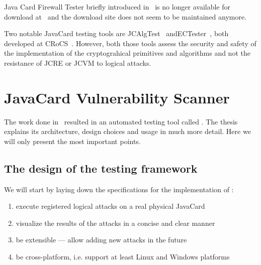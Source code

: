 \documentclass{../llncs/llncs}
\begin{document}

Java Card Firewall Tester briefly introduced in~\cite{Mostowski07testingthe} is no longer available for download at~\cite{firewalltester} and the download site does not seem to be maintained anymore.

Two notable JavaCard testing tools are JCAlgTest~\cite{jcalgtest} and\linebreak ECTester~\cite{ectester}, both developed at CRoCS~\cite{crocsweb}. However, both those tools assess the security and safety of the implementation of the cryptograhical primitives and algorithms and not the resistance of JCRE or JCVM to logical attacks.

\section{JavaCard Vulnerability Scanner}
    The work done in~\cite{anon2020thesis} resulted in an automated testing tool called \projectname. The thesis explains its architecture, design choices and usage in much more detail. Here we will only present the most important points.
    
    \subsection{The design of the testing framework}

    We will start by laying down the specifications for the implementation of \projectname:
    \begin{enumerate}
        \item execute registered logical attacks on a real physical JavaCard %
        \item visualize the results of the attacks in a concise and clear manner %
        \item be extensible --- allow adding new attacks in the future %
        \item be cross-platform, i.e. support at least Linux and Windows platforms %
    \end{enumerate}
\end{document}
